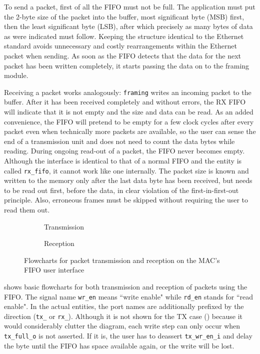 \documentclass[a4paper, 11pt, oneside]{Thesis}  %
\begin{document}
To send a packet, first of all the FIFO must not be full. The application must put the 2-byte size of the packet into the buffer, most significant byte (MSB) first, then the least significant byte (LSB), after which precisely as many bytes of data as were indicated must follow. Keeping the structure identical to the Ethernet standard avoids unnecessary and costly rearrangements within the Ethernet packet when sending. As soon as the FIFO detects that the data for the next packet has been written completely, it starts passing the data on to the framing module.

Receiving a packet works analogously: \texttt{framing} writes an incoming packet to the buffer. After it has been received completely and without errors, the RX FIFO will indicate that it is not empty and the size and data can be read. As an added convenience, the FIFO will pretend to be empty for a few clock cycles after every packet even when technically more packets are available, so the user can sense the end of a transmission unit and does not need to count the data bytes while reading. During ongoing read-out of a packet, the FIFO never becomes empty. Although the interface is identical to that of a normal FIFO and the entity is called \texttt{rx\_fifo}, it cannot work like one internally. The packet size is known and written to the memory only after the last data byte has been received, but needs to be read out first, before the data, in clear violation of the first-in-first-out principle. Also, erroneous frames must be skipped without requiring the user to read them out.

\begin{figure}
\centering
{
\setlength{\fboxrule}{0pt}
\begin{subfigure}[b]{0.45\textwidth}
\fbox{}
\caption{Transmission}
\label{fig:fifo_flow_tx}
\end{subfigure}
\begin{subfigure}[b]{0.45\textwidth}
\fbox{}
\caption{Reception}
\label{fig:fifo_flow_rx}
\end{subfigure}
}
\caption{Flowcharts for packet transmission and reception on the MAC's FIFO user interface}
\label{fig:fifo_flow}
\end{figure}

 shows basic flowcharts for both transmission and reception of packets using the FIFO. The signal name \texttt{wr\_en} means ``write enable" while \texttt{rd\_en} stands for ``read enable". In the actual entities, the port names are additionally prefixed by the direction (\texttt{tx\_} or \texttt{rx\_}). Although it is not shown for the TX case () because it would considerably clutter the diagram, each write step can only occur when \texttt{tx\_full\_o} is not asserted. If it is, the user has to deassert \texttt{tx\_wr\_en\_i} and delay the byte until the FIFO has space available again, or the write will be lost.
\end{document}
